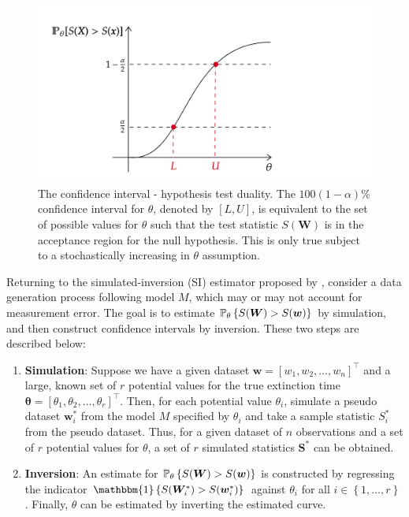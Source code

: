 \begin{figure}[ht]
    \centering
    \includegraphics[width=\linewidth]{figures/inversion-diagram.png}
    \caption{The confidence interval - hypothesis test duality. The $100(1-\alpha)\%$ confidence interval for $\theta$, denoted by $[L, U]$, is equivalent to the set of possible values for $\theta$ such that the test statistic $S(\bm{W})$ is in the acceptance region for the null hypothesis. This is only true subject to a stochastically increasing in $\theta$ assumption.}
    \label{fig:inversion_diagram}
\end{figure}

Returning to the simulated-inversion (SI) estimator proposed by \citet{Huang2019}, consider a data generation process following model $M$, which may or may not account for measurement error. The goal is to estimate $\mathbb{P}_\theta\left\{S(\bm{W}) > S(\bm{w})\right\}$ by simulation, and then construct confidence intervals by inversion. These two steps are described below:

\begin{enumerate}
    \item \textbf{Simulation}: Suppose we have a given dataset $\bm{w} = [w_1, w_2, \dots, w_n]^\top$ and a large, known set of $r$ potential values for the true extinction time $\bm{\theta} = [\theta_1, \theta_2, \dots, \theta_r]^\top$. Then, for each potential value $\theta_i$, simulate a pseudo dataset $\bm{w}^*_i$ from the model $M$ specified by $\theta_i$ and take a sample statistic $S^*_i$ from the pseudo dataset. Thus, for a given dataset of $n$ observations and a set of $r$ potential values for $\theta$, a set of $r$ simulated statistics $\bm{S}^*$ can be obtained.
    \item \textbf{Inversion}: An estimate for $\mathbb{P}_\theta\left\{S(\bm{W}) > S(\bm{w})\right\}$ is constructed by regressing the indicator $\mathbbm{1}\left\{ S(\bm{W}^*_i) > S(\bm{w}^*_i) \right\}$ against $\theta_i$ for all $i \in \left\{ 1, \dots, r \right\}$. Finally, $\theta$ can be estimated by inverting the estimated curve.
\end{enumerate}

